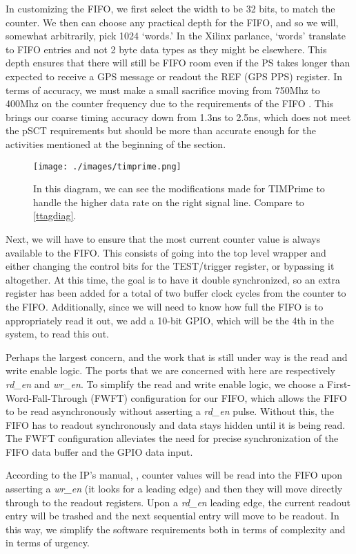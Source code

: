 In customizing the FIFO, we first select the width to be 32 bits, to match the counter. We then can choose any practical depth for the FIFO, and so we will, somewhat arbitrarily, pick 1024 `words.' In the Xilinx parlance, `words' translate to FIFO entries and not 2 byte data types as they might be elsewhere. This depth ensures that there will still be FIFO room even if the PS takes longer than expected to receive a GPS message or readout the REF (GPS PPS) register. In terms of accuracy, we must make a small sacrifice moving from 750Mhz to 400Mhz on the counter frequency due to the requirements of the FIFO \cite{fifo}. This brings our coarse timing accuracy down from 1.3ns to 2.5ns, which does not meet the pSCT requirements but should be more than accurate enough for the activities mentioned at the beginning of the section. 
\begin{figure}[H]
\centering
\texttt{[image: ./images/timprime.png]}
\caption[TIMPrime Time-Tagging PL]{In this diagram, we can see the modifications made for TIMPrime to handle the higher data rate on the right signal line. Compare to \autoref{ttagdiag}.}
\label{timprime}
\end{figure}
Next, we will have to ensure that the most current counter value is always available to the FIFO. This consists of going into the top level wrapper and either changing the control bits for the TEST/trigger register, or bypassing it altogether. At this time, the goal is to have it double synchronized, so an extra register has been added for a total of two buffer clock cycles from the counter to the FIFO. Additionally, since we will need to know how full the FIFO is to appropriately read it out, we add a 10-bit GPIO, which will be the 4th in the system, to read this out. 

Perhaps the largest concern, and the work that is still under way is the read and write enable logic. The ports that we are concerned with here are respectively \textit{rd\_en} and \textit{wr\_en}. To simplify the read and write enable logic, we choose a First-Word-Fall-Through (FWFT) configuration for our FIFO, which allows the FIFO to be read asynchronously without asserting a \textit{rd\_en} pulse. Without this, the FIFO has to readout synchronously and data stays hidden until it is being read. The FWFT configuration alleviates the need for precise synchronization of the FIFO data buffer and the GPIO data input. 

According to the IP's manual, \textcite{fifo}, counter values will be read into the FIFO upon asserting a \textit{wr\_en} (it looks for a leading edge) and then they will move directly through to the readout registers. Upon a \textit{rd\_en} leading edge, the current readout entry will be trashed and the next sequential entry will move to be readout. In this way, we simplify the software requirements both in terms of complexity and in terms of urgency. 

